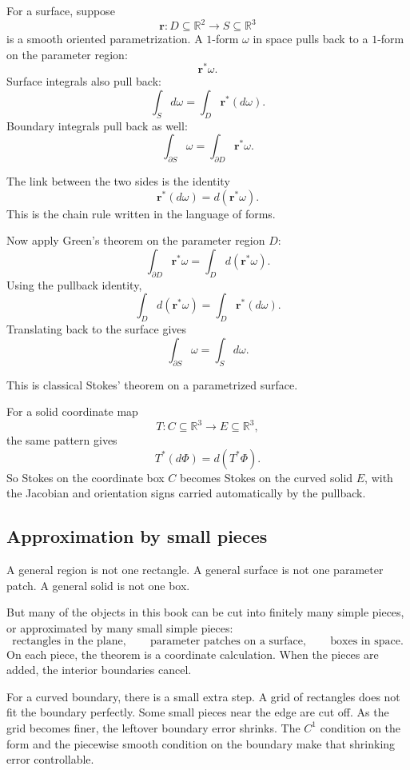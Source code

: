 For a surface, suppose
\[
    \mathbf r:D\subseteq\mathbb R^2\to S\subseteq\mathbb R^3
\]
is a smooth oriented parametrization.  A \(1\)-form \(\omega\) in space pulls back to a
\(1\)-form on the parameter region:
\[
    \mathbf r^*\omega.
\]
Surface integrals also pull back:
\[
    \int_S d\omega=\int_D \mathbf r^*(d\omega).
\]
Boundary integrals pull back as well:
\[
    \int_{\partial S}\omega=\int_{\partial D}\mathbf r^*\omega.
\]

The link between the two sides is the identity
\[
\boxed{
    \mathbf r^*(d\omega)=d(\mathbf r^*\omega).
}
\]
This is the chain rule written in the language of forms.

Now apply Green's theorem on the parameter region \(D\):
\[
    \int_{\partial D}\mathbf r^*\omega
    =
    \int_D d(\mathbf r^*\omega).
\]
Using the pullback identity,
\[
    \int_D d(\mathbf r^*\omega)
    =
    \int_D \mathbf r^*(d\omega).
\]
Translating back to the surface gives
\[
\boxed{
    \int_{\partial S}\omega=\int_S d\omega.
}
\]

This is classical Stokes' theorem on a parametrized surface.

For a solid coordinate map
\[
    T:C\subseteq\mathbb R^3\to E\subseteq\mathbb R^3,
\]
the same pattern gives
\[
    T^*(d\Phi)=d(T^*\Phi).
\]
So Stokes on the coordinate box \(C\) becomes Stokes on the curved solid \(E\), with the
Jacobian and orientation signs carried automatically by the pullback.

\subsection{Approximation by small pieces}

A general region is not one rectangle.  A general surface is not one parameter patch.
A general solid is not one box.

But many of the objects in this book can be cut into finitely many simple pieces, or
approximated by many small simple pieces:
\[
    \text{rectangles in the plane},
    \qquad
    \text{parameter patches on a surface},
    \qquad
    \text{boxes in space}.
\]
On each piece, the theorem is a coordinate calculation.  When the pieces are added,
the interior boundaries cancel.

For a curved boundary, there is a small extra step.  A grid of rectangles does not fit the
boundary perfectly.  Some small pieces near the edge are cut off.  As the grid becomes
finer, the leftover boundary error shrinks.  The \(C^1\) condition on the form and the
piecewise smooth condition on the boundary make that shrinking error controllable.

